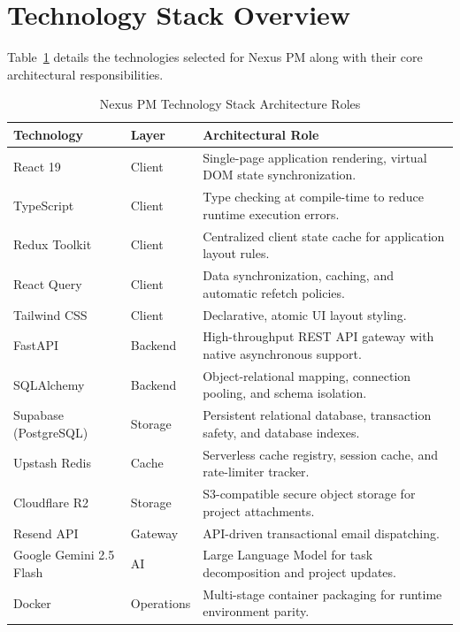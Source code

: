 \section{Technology Stack Overview}
Table~\ref{tab:hld_tech_stack} details the technologies selected for Nexus PM along with their core architectural responsibilities.

\begin{table}[h!]
\centering
\small
\renewcommand{\arraystretch}{1.5}
\begin{tabularx}{\textwidth}{l l X}
    \toprule[1.5pt]
    \rowcolor{primary!5}
    \textbf{\color{primary}Technology} & \textbf{\color{primary}Layer} & \textbf{\color{primary}Architectural Role} \\
    \midrule
    React 19 & Client & Single-page application rendering, virtual DOM state synchronization. \\
    TypeScript & Client & Type checking at compile-time to reduce runtime execution errors. \\
    Redux Toolkit & Client & Centralized client state cache for application layout rules. \\
    React Query & Client & Data synchronization, caching, and automatic refetch policies. \\
    Tailwind CSS & Client & Declarative, atomic UI layout styling. \\
    FastAPI & Backend & High-throughput REST API gateway with native asynchronous support. \\
    SQLAlchemy & Backend & Object-relational mapping, connection pooling, and schema isolation. \\
    Supabase (PostgreSQL) & Storage & Persistent relational database, transaction safety, and database indexes. \\
    Upstash Redis & Cache & Serverless cache registry, session cache, and rate-limiter tracker. \\
    Cloudflare R2 & Storage & S3-compatible secure object storage for project attachments. \\
    Resend API & Gateway & API-driven transactional email dispatching. \\
    Google Gemini 2.5 Flash & AI & Large Language Model for task decomposition and project updates. \\
    Docker & Operations & Multi-stage container packaging for runtime environment parity. \\
    \bottomrule[1.5pt]
\end{tabularx}
\caption{Nexus PM Technology Stack Architecture Roles}
\label{tab:hld_tech_stack}
\end{table}

